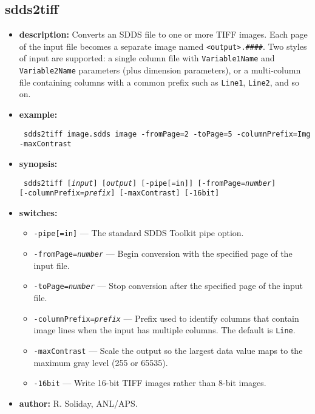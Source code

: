\newpage
\subsection{sdds2tiff}
\label{sdds2tiff}

\begin{itemize}
\item {\bf description:} Converts an SDDS file to one or more TIFF images.  Each page of the input
file becomes a separate image named {\tt <output>.####}.  Two styles of input are
supported: a single column file with {\tt Variable1Name} and {\tt Variable2Name}
parameters (plus dimension parameters), or a multi-column file containing
columns with a common prefix such as {\tt Line1}, {\tt Line2}, and so on.
\item {\bf example:}
\begin{flushleft}{\tt
sdds2tiff image.sdds image -fromPage=2 -toPage=5 -columnPrefix=Img -maxContrast
}\end{flushleft}
\item {\bf synopsis:}
\begin{flushleft}{\tt
sdds2tiff [{\em input}] [{\em output}] [-pipe[=in]] [-fromPage={\em number}]\\
  [-toPage={\em number}] [-columnPrefix={\em prefix}] [-maxContrast] [-16bit]
}\end{flushleft}
\item {\bf switches:}
  \begin{itemize}
  \item {\tt -pipe[=in]} --- The standard SDDS Toolkit pipe option.
  \item {\tt -fromPage={\em number}} --- Begin conversion with the specified page
    of the input file.
  \item {\tt -toPage={\em number}} --- Stop conversion after the specified page
    of the input file.
  \item {\tt -columnPrefix={\em prefix}} --- Prefix used to identify columns that
    contain image lines when the input has multiple columns.  The default is
    {\tt Line}.
  \item {\tt -maxContrast} --- Scale the output so the largest data value maps to
    the maximum gray level (255 or 65535).
  \item {\tt -16bit} --- Write 16-bit TIFF images rather than 8-bit images.
  \end{itemize}
\item {\bf author:} R. Soliday, ANL/APS.
\end{itemize}
